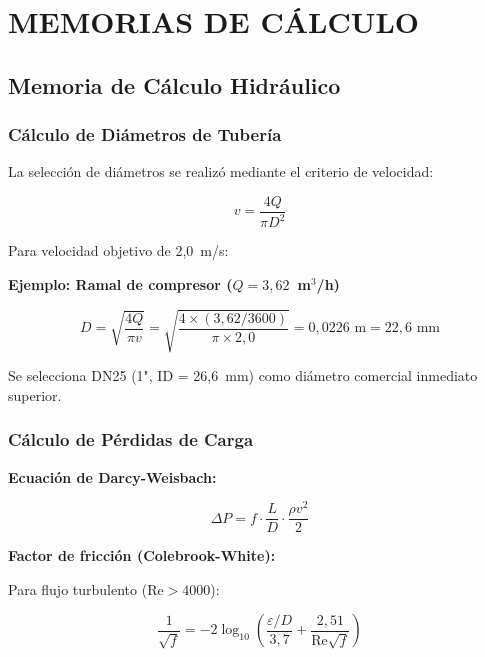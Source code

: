 \documentclass[12pt,a4paper]{article}
\begin{document}
\newpage

\appendix

\section{MEMORIAS DE CÁLCULO}

\subsection{Memoria de Cálculo Hidráulico}
\label{sec:memoria_hidraulico}

\subsubsection{Cálculo de Diámetros de Tubería}

La selección de diámetros se realizó mediante el criterio de velocidad:

\begin{equation}
v = \frac{4Q}{\pi D^2}
\end{equation}

Para velocidad objetivo de 2,0~m/s:

\textbf{Ejemplo: Ramal de compresor ($Q = 3{,}62$~m$^3$/h)}

\begin{equation}
D = \sqrt{\frac{4Q}{\pi v}} = \sqrt{\frac{4 \times (3{,}62/3600)}{\pi \times 2{,}0}} = 0{,}0226 \text{ m} = 22{,}6 \text{ mm}
\end{equation}

Se selecciona DN25 (1", ID = 26,6~mm) como diámetro comercial inmediato superior.

\subsubsection{Cálculo de Pérdidas de Carga}

\textbf{Ecuación de Darcy-Weisbach:}

\begin{equation}
\Delta P = f \cdot \frac{L}{D} \cdot \frac{\rho v^2}{2}
\end{equation}

\textbf{Factor de fricción (Colebrook-White):}

Para flujo turbulento ($\text{Re} > 4000$):

\begin{equation}
\frac{1}{\sqrt{f}} = -2 \log_{10} \left( \frac{\varepsilon/D}{3{,}7} + \frac{2{,}51}{\text{Re}\sqrt{f}} \right)
\end{equation}
\end{document}
